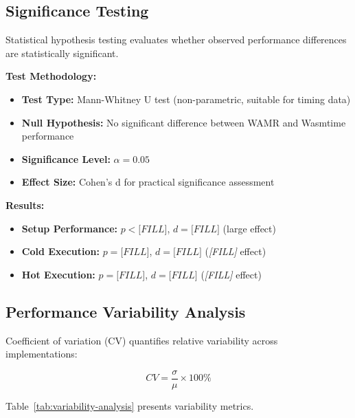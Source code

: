 \subsection{Significance Testing}
\label{subsec:significance-testing}

Statistical hypothesis testing evaluates whether observed performance differences are statistically significant.

\textbf{Test Methodology:}
\begin{itemize}
    \item \textbf{Test Type:} Mann-Whitney U test (non-parametric, suitable for timing data)
    \item \textbf{Null Hypothesis:} No significant difference between WAMR and Wasmtime performance
    \item \textbf{Significance Level:} $\alpha = 0.05$
    \item \textbf{Effect Size:} Cohen's d for practical significance assessment
\end{itemize}

\textbf{Results:}
\begin{itemize}
    \item \textbf{Setup Performance:} $p < \textit{[FILL]}$, $d = \textit{[FILL]}$ (large effect)
    \item \textbf{Cold Execution:} $p = \textit{[FILL]}$, $d = \textit{[FILL]}$ (\textit{[FILL]} effect)
    \item \textbf{Hot Execution:} $p = \textit{[FILL]}$, $d = \textit{[FILL]}$ (\textit{[FILL]} effect)
\end{itemize}

\subsection{Performance Variability Analysis}
\label{subsec:variability-analysis}

Coefficient of variation (CV) quantifies relative variability across implementations:

\begin{equation}
CV = \frac{\sigma}{\mu} \times 100\%
\end{equation}

Table~\ref{tab:variability-analysis} presents variability metrics.


